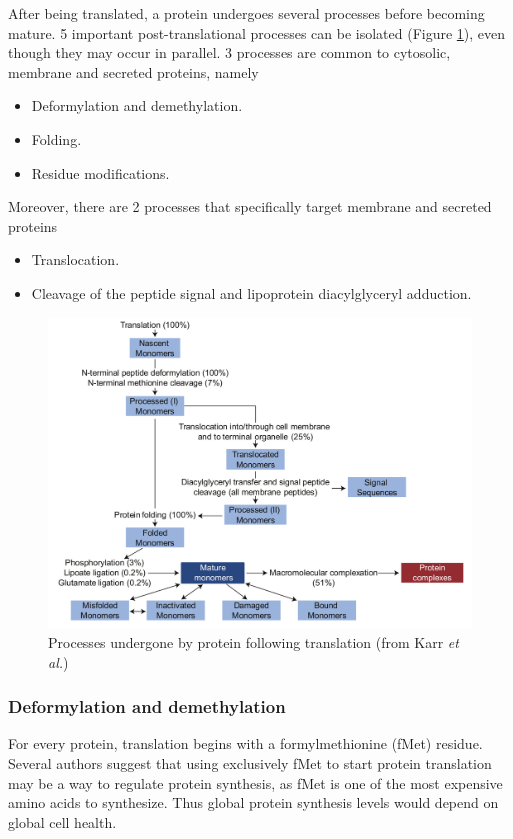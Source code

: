 
After being translated, a protein undergoes several processes before becoming mature. 5 important post-translational processes can be isolated (Figure \ref{fig:pTP}), even though they may occur in parallel. 3 processes are common to cytosolic, membrane and secreted proteins, namely
\begin{itemize}
\item Deformylation and demethylation.
\item Folding.
\item Residue modifications.
\end{itemize}

Moreover, there are 2 processes that specifically target membrane and secreted proteins
\begin{itemize}
\item Translocation.
\item Cleavage of the peptide signal and lipoprotein diacylglyceryl adduction.
\end{itemize}

\begin{figure}[!ht]
\centering
\includegraphics[width=0.8\linewidth]{figure/proteinProcesses}
\caption{Processes undergone by protein following translation (from Karr \textit{et al.})}
\label{fig:pTP}
\end{figure}

\subsubsection{Deformylation and demethylation}

For every protein, translation begins with a formylmethionine (fMet) residue. Several authors suggest that using exclusively fMet to start protein translation may be a way to regulate protein synthesis, as fMet is one of the most expensive amino acids to synthesize. Thus global protein synthesis levels would depend on global cell health.

